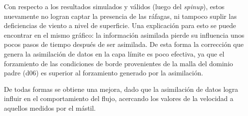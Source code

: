Con respecto a los resultados simulados y válidos (luego del \emph{spinup}), estos nuevamente no logran captar la presencia de las ráfagas, ni tampoco suplir las deficiencias de viento a nivel de superficie. Una explicación para esto se puede encontrar en el mismo gráfico: la información asimilada pierde su influencia unos pocos pasos de tiempo después de ser asimilada. De esta forma la corrección que genera la asimilación de datos en la capa límite es poco efectiva, ya que el forzamiento de las condiciones de borde provenientes de la malla del dominio padre (d06) es superior al forzamiento generado por la asimilación.

De todas formas se obtiene una mejora, dado que la asimilación de datos logra influir en el comportamiento del flujo, acercando los valores de la velocidad a aquellos medidos por el mástil.

